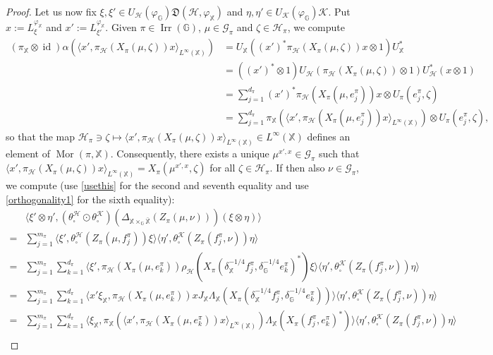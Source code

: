 \documentclass[reqno]{amsart}
\numberwithin{equation}{section}
\newcommand\XGX{\X\times_\G \bar{\X}}
\DeclareMathOperator{\id}{\mathrm{id}}
\DeclareMathOperator{\Irr}{\mathrm{Irr}}
\newcommand{\mcG}{\mathcal{G}}
\newcommand{\mcH}{\mathcal{H}}
\newcommand{\mcK}{\mathcal{K}}
\newcommand{\G}{\mathbb{G}}
\newcommand{\X}{\mathbb{X}}
\begin{document}
\begin{proof}
Let us now fix $\xi, \xi'\in U_{\mcH}(\varphi_\G)\mathfrak{D}(\mcH, \varphi_\X)$ and $\eta, \eta'\in U_{\mcK}(\varphi_\G)\mcK$. Put $x:= L_{\xi}^{\varphi_\X}$ and $x':= L_{\xi'}^{\varphi_\X}$. Given $\pi\in \Irr(\G)$, $\mu\in\mcG_\pi$ and $\zeta\in \mcH_\pi$, we compute
 \begin{align*}
        (\pi_\X\otimes \id)\alpha(\langle x', \pi_\mcH(X_\pi(\mu, \zeta)) x\rangle_{L^\infty(\X)})&= U_\X((x')^*\pi_\mcH(X_\pi(\mu, \zeta))x\otimes 1)U_\X^*\\
        &= ((x')^*\otimes 1)U_\mcH(\pi_\mcH(X_\pi(\mu, \zeta))\otimes 1)U_\mcH^*(x\otimes 1)\\
        &= \sum_{j=1}^{d_\pi}(x')^*\pi_\mcH(X_\pi(\mu, e_j^\pi)) x \otimes U_\pi(e_j^\pi, \zeta)\\
        &= \sum_{j=1}^{d_\pi}\pi_\X(\langle x', \pi_\mcH(X_\pi(\mu, e_j^\pi)) x\rangle_{L^\infty(\X)})\otimes U_\pi(e_j^\pi, \zeta), 
    \end{align*}
    so that the map $\mcH_\pi\ni \zeta\mapsto \langle x', \pi_\mcH(X_\pi(\mu, \zeta)) x\rangle_{L^\infty(\X)}\in L^\infty(\X)$ defines an element of $\operatorname{Mor}(\pi, \X)$. Consequently, there exists a unique $\mu^{x',x}\in \mcG_\pi$ such that $\langle x', \pi_\mcH(X_\pi(\mu, \zeta)) x\rangle_{L^\infty(\X)} =  X_\pi(\mu^{x',x},\zeta)$ for all $\zeta \in \mcH_\pi$. If then also $\nu \in \mcG_\pi$, we compute (use \eqref{usethis} for the second and seventh equality and use \eqref{orthogonality1} for the sixth equality):
\begin{align*}
    &\langle \xi'\otimes \eta', (\theta_\square^\mcH \odot \theta_\square^\mcK)(\Delta_{\XGX}(Z_\pi(\mu, \nu)))(\xi\otimes \eta)\rangle\\
    = &\sum_{j=1}^{m_\pi}\langle \xi', \theta_\square^\mcH(Z_\pi(\mu, f_j^\pi))\xi\rangle \langle \eta', \theta_\square^\mcK(Z_\pi(f_j^\pi, \nu))\eta\rangle\\
    = &\sum_{j=1}^{m_\pi}\sum_{k=1}^{d_\pi} \langle \xi', \pi_\mcH(X_\pi(\mu, e_k^\pi))\rho_\mcH(X_\pi(\delta_\X^{-1/4}f_j^\pi, \delta_\G^{-1/4}e_k^\pi)^*)\xi\rangle \langle \eta', \theta_\square^\mcK(Z_\pi(f_j^\pi, \nu))\eta\rangle\\
    = &\sum_{j=1}^{m_\pi}\sum_{k=1}^{d_\pi}\langle x'\xi_\X, \pi_\mcH(X_\pi(\mu, e_k^\pi)) xJ_\X \Lambda_\X(X_\pi(\delta_\X^{-1/4}f_j^\pi, \delta_\G^{-1/4}e_k^\pi))\rangle\langle \eta', \theta_\square^\mcK(Z_\pi(f_j^\pi, \nu))\eta\rangle\\
    = &\sum_{j=1}^{m_\pi}\sum_{k=1}^{d_\pi}\langle \xi_\X, \pi_\X(\langle x', \pi_\mcH(X_\pi(\mu, e_k^\pi))x\rangle_{L^\infty(\X)} )\Lambda_\X(X_\pi(f_j^\pi, e_k^\pi)^*)\rangle\langle \eta', \theta_\square^\mcK(Z_\pi(f_j^\pi, \nu))\eta\rangle\\

\end{align*}
\end{proof}
\end{document}
